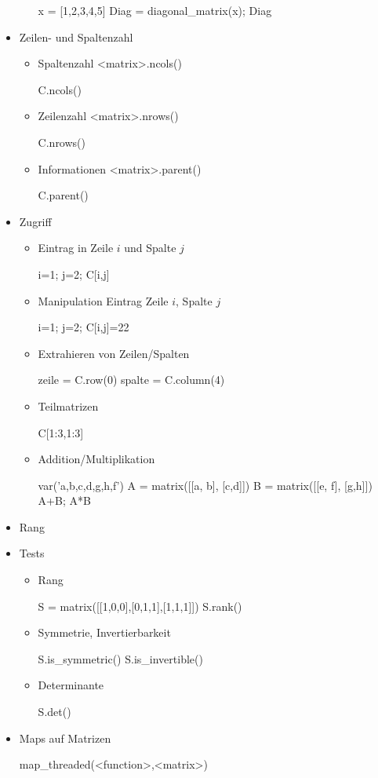 \documentclass[a4paper,9pt,DIV15,twocolumn]{scrartcl}
\begin{document}
\begin{itemize}
\begin{itemize}
\begin{sagein}
x = [1,2,3,4,5]
Diag = diagonal_matrix(x); Diag
\end{sagein}
\end{itemize}
\item Zeilen- und Spaltenzahl
\begin{itemize}
 \item Spaltenzahl <matrix>.ncols()
\begin{sagein}
C.ncols()
\end{sagein}
\item Zeilenzahl <matrix>.nrows()
\begin{sagein}
C.nrows()
\end{sagein}
\item Informationen <matrix>.parent()
\begin{sagein}
C.parent()
\end{sagein}
\end{itemize}
\bigskip
\bigskip
\item Zugriff
\begin{itemize}
 \item Eintrag in Zeile $i$ und Spalte $j$
\begin{sagein}
i=1; j=2; C[i,j]
\end{sagein}
\item Manipulation Eintrag Zeile $i$, Spalte $j$
\begin{sagein}
i=1; j=2; C[i,j]=22
\end{sagein}
\item Extrahieren von Zeilen/Spalten
\begin{sagein}
zeile = C.row(0)
spalte = C.column(4)
\end{sagein}
\item Teilmatrizen
\begin{sagein}
C[1:3,1:3]
\end{sagein}
\item Addition/Multiplikation
\begin{sagein}
var('a,b,c,d,g,h,f')
A = matrix([[a, b], [c,d]])
B = matrix([[e, f], [g,h]])
A+B; A*B
\end{sagein}
\end{itemize}
\item Rang
\item Tests
\begin{itemize}
 \item Rang 
\begin{sagein}
S = matrix([[1,0,0],[0,1,1],[1,1,1]])
S.rank()
\end{sagein}
\item Symmetrie, Invertierbarkeit
\begin{sagein}
S.is_symmetric() 
S.is_invertible()
\end{sagein}
\item Determinante
\begin{sagein}
S.det()
\end{sagein}
\end{itemize}
\item Maps auf Matrizen
\begin{sagein}
map_threaded(<function>,<matrix>)
\end{sagein}
\end{itemize}
\end{document}
